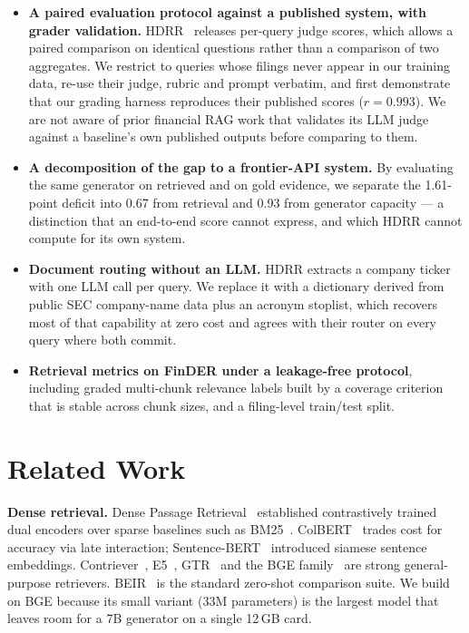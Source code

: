 \documentclass[conference]{IEEEtran}
\begin{document}
\begin{itemize}
\item \textbf{A paired evaluation protocol against a published system, with
grader validation.} HDRR~\cite{hdrr2026} releases per-query judge scores, which
allows a paired comparison on identical questions rather than a comparison of
two aggregates. We restrict to queries whose filings never appear in our
training data, re-use their judge, rubric and prompt verbatim, and first
demonstrate that our grading harness reproduces their published scores
($r=0.993$). We are not aware of prior financial RAG work that validates its
LLM judge against a baseline's own published outputs before comparing to them.

\item \textbf{A decomposition of the gap to a frontier-API system.} By
evaluating the same generator on retrieved and on gold evidence, we separate
the 1.61-point deficit into 0.67 from retrieval and 0.93 from generator
capacity --- a distinction that an end-to-end score cannot express, and which
HDRR cannot compute for its own system.

\item \textbf{Document routing without an LLM.} HDRR extracts a company ticker
with one LLM call per query. We replace it with a dictionary derived from
public SEC company-name data plus an acronym stoplist, which recovers most of
that capability at zero cost and agrees with their router on every query where
both commit.

\item \textbf{Retrieval metrics on FinDER under a leakage-free protocol},
including graded multi-chunk relevance labels built by a coverage criterion
that is stable across chunk sizes, and a filing-level train/test split.
\end{itemize}

\section{Related Work}
\textbf{Dense retrieval.} Dense Passage Retrieval~\cite{karpukhin2020dpr}
established contrastively trained dual encoders over sparse baselines such as
BM25~\cite{robertson2009bm25}. ColBERT~\cite{khattab2020colbert} trades cost
for accuracy via late interaction; Sentence-BERT~\cite{reimers2019sbert}
introduced siamese sentence embeddings. Contriever~\cite{izacard2022contriever},
E5~\cite{wang2022e5}, GTR~\cite{ni2022gtr} and the BGE
family~\cite{xiao2023bge} are strong general-purpose retrievers.
BEIR~\cite{thakur2021beir} is the standard zero-shot comparison suite. We build
on BGE because its small variant (33M parameters) is the largest model that
leaves room for a 7B generator on a single 12\,GB card.
\end{document}
